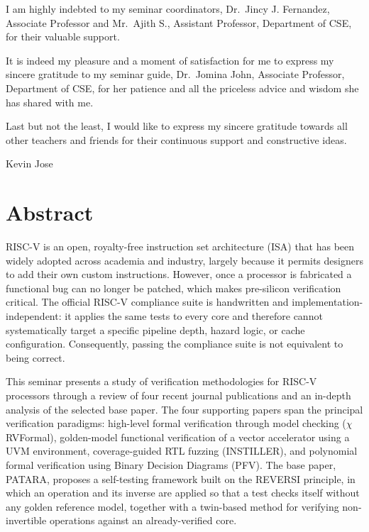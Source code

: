 \documentclass[12pt,a4paper]{report}
\begin{document}
\vspace{0.4cm}
\hspace{0.5cm} I am highly indebted to my seminar coordinators, Dr.\ Jincy J. Fernandez,
Associate Professor and Mr.\ Ajith S., Assistant Professor, Department of CSE, for their
valuable support.

\vspace{0.4cm}
\hspace{0.5cm} It is indeed my pleasure and a moment of satisfaction for me to express my
sincere gratitude to my seminar guide, Dr.\ Jomina John, Associate Professor, Department
of CSE, for her patience and all the priceless advice and wisdom she has shared with me.

\vspace{0.4cm}
\hspace{0.5cm} Last but not the least, I would like to express my sincere gratitude
towards all other teachers and friends for their continuous support and constructive
ideas.

\vspace{1.0cm}
\begin{flushright}
Kevin Jose
\end{flushright}

\chapter*{Abstract}

\hspace{0.5cm} RISC-V is an open, royalty-free instruction set architecture (ISA) that
has been widely adopted across academia and industry, largely because it permits
designers to add their own custom instructions. However, once a processor is fabricated a
functional bug can no longer be patched, which makes pre-silicon verification critical.
The official RISC-V compliance suite is handwritten and implementation-independent: it
applies the same tests to every core and therefore cannot systematically target a specific
pipeline depth, hazard logic, or cache configuration. Consequently, passing the compliance
suite is not equivalent to being correct.

This seminar presents a study of verification methodologies for RISC-V processors through
a review of four recent journal publications and an in-depth analysis of the selected base
paper. The four supporting papers span the principal verification paradigms: high-level
formal verification through model checking ($\chi$RVFormal), golden-model functional
verification of a vector accelerator using a UVM environment, coverage-guided RTL fuzzing
(INSTILLER), and polynomial formal verification using Binary Decision Diagrams (PFV). The
base paper, PATARA, proposes a self-testing framework built on the REVERSI principle, in
which an operation and its inverse are applied so that a test checks itself without any
golden reference model, together with a twin-based method for verifying non-invertible
operations against an already-verified core.
\end{document}
